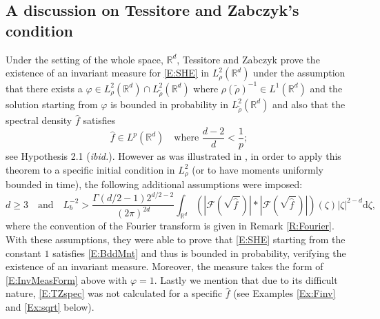 \documentclass[12pt]{report}
\theoremstyle{plain}
\theoremstyle{definition}
\numberwithin{equation}{section}
\newcommand{\R}{\mathbb{R}}
\newcommand{\ud}{\ensuremath{ \mathrm{d} }}
\begin{document}
\subsection{A discussion on Tessitore and Zabczyk's condition} \label{SS:TessZabz}

Under the setting of the whole space, $\R^d$, Tessitore and Zabczyk
\cite{tessitore.zabczyk:98:invariant} prove the existence of an invariant measure for \eqref{E:SHE} in
$L^2_{\rho}(\R^d)$ under the assumption that there exists a $\varphi \in L^2_{\rho}(\R^d) \cap
L^2_{\widetilde\rho}(\R^d)$ where $\rho (\widetilde\rho)^{-1} \in L^1(\R^d)$ and the solution
starting from $\varphi$ is bounded in probability in $L^2_{\widetilde \rho}(\R^d)$ and also that the
spectral density $\hat{f}$ satisfies
\begin{equation} \label{E:CorTZ}
\widehat{f} \in L^p(\R^d) \quad \text{where } \frac{d-2}{d} < \frac{1}{p};
\end{equation}
see Hypothesis 2.1 ({\it ibid.}). However as was illustrated in \cite[Theorem
3.3]{tessitore.zabczyk:98:invariant}, in order to apply this theorem to a specific initial condition in $L^2_{\rho}$ (or to have moments uniformly
bounded in time), the following additional
assumptions were imposed:
\begin{equation} \label{E:TZspec}
d\ge 3 \quad \text{and} \quad
L_b^{-2}> \frac{\Gamma(d/2 -1)2^{d/2-2}}{(2\pi)^{2d}} \int_{\R^d} \left(\left|  \mathcal{F}\left(\sqrt{ \widehat{f}\: }\right) \right| * \left| \mathcal{F}\left(\sqrt{ \widehat{f}\: }\right)\right|\right) (\zeta) |\zeta|^{2-d} \ud \zeta ,
\end{equation}
where the convention of the Fourier transform is given in Remark \ref{R:Fourier}. With these assumptions,
they were able to prove that \eqref{E:SHE} starting from the constant $1$ satisfies \eqref{E:BddMnt}
and thus is bounded in probability, verifying the existence of an invariant measure. Moreover, the
measure takes the form of \eqref{E:InvMeasForm} above with $\varphi = 1$. Lastly we mention that due to its difficult nature, \eqref{E:TZspec} was not calculated for a specific $\widehat{f}$ (see Examples \ref{Ex:Finv} and \ref{Ex:sqrt} below).
\end{document}
